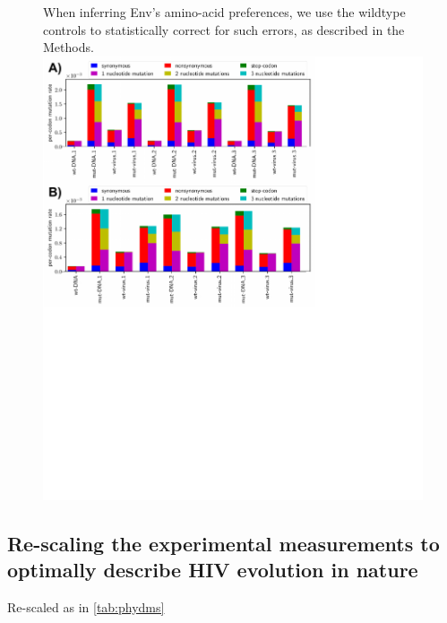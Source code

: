 \documentclass[9pt,lineno]{elife}
\begin{document}
\begin{figure}
{When inferring Env's amino-acid preferences, we use the wildtype controls to statistically correct for such errors, as described in the Methods.}{\includegraphics[width=5in]{figures/mutfreqs_supp/mutfreqs_supp}}
\end{figure}


\subsection*{Re-scaling the experimental measurements to optimally describe HIV evolution in nature}

Re-scaled as in \ref{tab:phydms}
\end{document}
